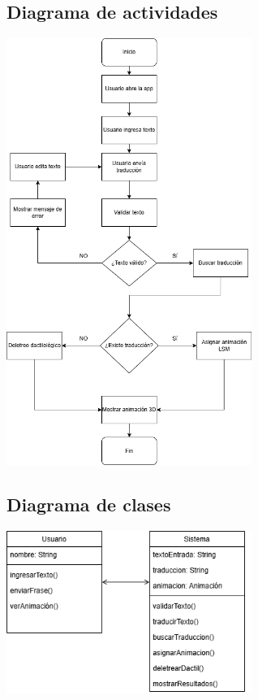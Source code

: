 \subsection{Diagrama de actividades}
\begin{center}
    \includegraphics[width=0.6\textwidth]{Images/Cap 3/Actividades.png}
\end{center}

\subsection{Diagrama de clases}
\begin{center}
    \includegraphics[width=0.6\textwidth]{Images/Cap 3/Clases.png}
\end{center}

